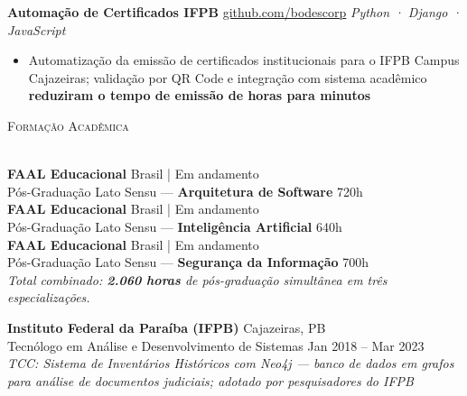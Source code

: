 \documentclass[a4paper]{article}
\newcommand{\lineunder}{
    \vspace*{-8pt} \\
    \hspace*{-18pt} \hrulefill \\
}
\newcommand{\header}[1]{
    {\hspace*{-18pt}\vspace*{6pt} \textsc{#1}}
    \vspace*{-6pt} \lineunder
}
\begin{document}
\textbf{Automação de Certificados IFPB}
\hfill {\small \href{https://github.com/bodescorp/Cext-final-}{github.com/bodescorp}}
\hfill {\sl Python · Django · JavaScript}\\
\vspace{-3mm}
\begin{itemize}[leftmargin=*, itemsep=-2pt]
    \item Automatização da emissão de certificados institucionais para o IFPB Campus Cajazeiras; validação por QR Code e integração com sistema acadêmico \textbf{reduziram o tempo de emissão de horas para minutos}
\end{itemize}

\vspace{3mm}
\pagebreak

\header{Formação Acadêmica}
\vspace{2mm}

\textbf{FAAL Educacional} \hfill Brasil | Em andamento\\
Pós-Graduação Lato Sensu — \textbf{Arquitetura de Software} \hfill 720h\\
\vspace{1mm}
\textbf{FAAL Educacional} \hfill Brasil | Em andamento\\
Pós-Graduação Lato Sensu — \textbf{Inteligência Artificial} \hfill 640h\\
\vspace{1mm}
\textbf{FAAL Educacional} \hfill Brasil | Em andamento\\
Pós-Graduação Lato Sensu — \textbf{Segurança da Informação} \hfill 700h\\
\vspace{2mm}
{\small \textit{Total combinado: \textbf{2.060 horas} de pós-graduação simultânea em três especializações.}}\\
\vspace{3mm}

\textbf{Instituto Federal da Paraíba (IFPB)} \hfill Cajazeiras, PB\\
Tecnólogo em Análise e Desenvolvimento de Sistemas \hfill Jan 2018 -- Mar 2023\\
{\small \textit{TCC: Sistema de Inventários Históricos com Neo4j — banco de dados em grafos para análise de documentos judiciais; adotado por pesquisadores do IFPB}}\\

\vspace{3mm}
\end{document}
